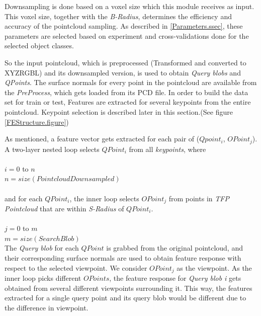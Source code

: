 Downsampling is done based on a voxel size which this module receives as input. This voxel size, together with the {\it B-Radius}, determines the efficiency and accuracy of the pointcloud sampling. As described in \ref{Parameters.ssec}, these parameters are selected based on experiment and cross-validations done for the selected object classes. 


So the input pointcloud, which is preprocessed (Transformed and converted to XYZRGBL) and its downsampled version, is used to obtain {\it Query blobs} and {\it QPoints}. The surface normals for every point in the pointcloud are available from the {\it PreProcess}, which gets loaded from its PCD file. In order to build the data set for train or test, Features are extracted for several keypoints from 
the entire pointcloud. Keypoint selection is described later in this section.(See figure \ref{FEStructure.figure}) 


As mentioned, a feature vector gets extracted for each pair of ($Qpoint_i$, $OPoint_j$). A two-layer nested loop selects $QPoint_i$ from all {\it keypoints}, where\\
\\
$i = 0$ to $n$ \\
$n = size(PointcloudDownsampled)$\\
\\
and for each $QPoint_i$, the inner loop selects $OPoint_j$ from points in {\it TFP Pointcloud} that are within {\it S-Radius} of $QPoint_i$.\\
\\
$j = 0$ to $m$\\
$m = size(SearchBlob)$\\




The {\it Query blob} for each $QPoint$ is grabbed from the original pointcloud, and their corresponding surface normals are used to obtain feature response with respect to the selected viewpoint. We consider $OPoint_j$ as the viewpoint. As the inner loop picks different $OPoints$, the feature response for {\it Query blob i} gets obtained from several different viewpoints surrounding it. This way, the features extracted for a single query point and its query blob would be different due to the difference in viewpoint.



